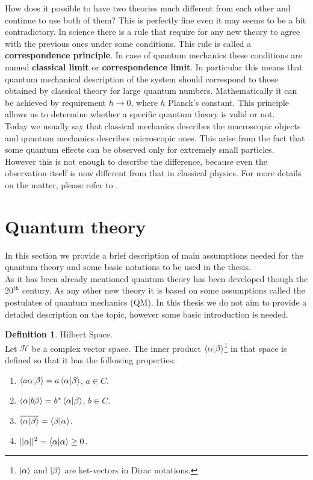 \documentclass[twoside,english]{uiofysmaster}
\theoremstyle{definition}
\newtheorem{defn}{Definition}
\begin{document}
How does it possible to have two theories much different from each other and continue to use both of them? This is perfectly fine even it may seems to be a bit contradictory. In science there is a rule that require for any new theory to agree with the previous ones under some conditions. This rule is called a \textbf{correspondence principle}. In case of quantum mechanics these conditions are named \textbf{classical limit} or \textbf{correspondence limit}. In particular this means that quantum mechanical description of the system should correspond to those obtained by classical theory for large quantum numbers. Mathematically it can be achieved by requirement $h \rightarrow 0$, where $h$ Planck's constant. This principle allows us to determine whether a specific quantum theory is valid or not.\\
Today we usually say that classical mechanics describes the macroscopic objects and quantum mechanics describes microscopic ones. This arise from the fact that some quantum effects can be observed only for extremely small particles. However this is not enough to describe the difference, because even the observation itself is now different from that in classical physics. 
For more details on the matter, please refer to \cite{phillipsIntroductionQuantumMechanics2003}. \\


\section{Quantum theory}
In this section we provide a brief description of main assumptions needed for the quantum theory and  some basic notations to be used in the thesis.\\
As it has been already mentioned quantum theory has been developed though the $20^{\text{th}}$ century. As any other new theory it is based on some assumptions called the postulates of quantum mechanics (QM). In this thesis we do not aim to provide a detailed description on the topic, however some basic introduction is needed.\\

\begin{defn} Hilbert Space.\\
	Let $\mathscr{H}$ be a complex vector space. The inner product $\braket{\alpha|\beta} $\footnote{$\ket{\alpha}$ and  $\ket{\beta}$ are ket-vectors in Dirac notations.} in that space is defined so that it has the following properties:
	\begin{enumerate}		
		\item $\braket{a\alpha|\beta} = a\braket{\alpha|\beta}$, $a \in C$.
		\item $\braket{\alpha|b\beta} = b^{*}\braket{\alpha|\beta}$, $b \in C$.
		\item $\overline{\braket{\alpha|\beta}} =\braket{\beta|\alpha}$.
		\item $||\alpha||^2= \braket{\alpha|\alpha} \geq 0 $.			
	\end{enumerate}
\end{defn}
\end{document}
